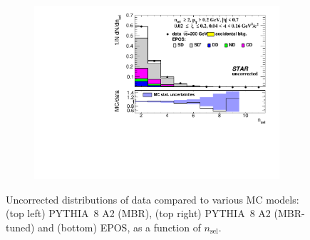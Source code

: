 \begin{figure}[h!]
\begin{subfigure}{.49\textwidth}
		\includegraphics[width=\linewidth, page=1]{chapters/chrgSTAR/img/nonSD/chrg/SDT_epos_xi0_RP_starsim_nsel.pdf}
	\end{subfigure}
	\begin{minipage}{.49\textwidth}
		\caption{Uncorrected distributions of data compared to various MC models: (top left) PYTHIA~8 A2 (MBR), (top right) PYTHIA~8 A2 (MBR-tuned) and (bottom) EPOS, as a function of $n_{\mathrm{sel}}$.}
		\label{fig:nonSDnsel}
	\end{minipage}
	
\end{figure}
